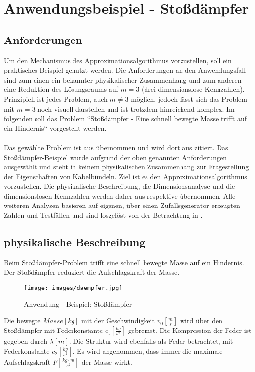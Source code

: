 \section{Anwendungsbeispiel - Stoßdämpfer}
\label{sec:anwendungBSP}
\subsection{Anforderungen}
\label{subsec:anforderungenBSP}
Um den Mechanismus des Approximationsalgorithmus vorzustellen, soll ein praktisches Beispiel genutzt werden. Die Anforderungen an den Anwendungsfall sind zum einen ein bekannter physikalischer Zusammenhang und zum anderen eine Reduktion des Lösungsraums auf $m = 3$ (drei dimensionslose Kennzahlen). Prinzipiell ist jedes Problem, auch $m \neq 3$ möglich, jedoch lässt sich das Problem mit $m = 3$ noch visuell darstellen und ist trotzdem hinreichend komplex. Im folgenden soll das Problem ``Stoßdämpfer - Eine schnell bewegte Masse trifft auf ein Hindernis`` vorgestellt werden.\\
\parskip 12pt \\
Das gewählte Problem ist aus \cite{Her04} übernommen und wird dort aus \cite{Szi89} zitiert. Das Stoßdämpfer-Beispiel wurde aufgrund der oben genannten Anforderungen ausgewählt und steht in keinem physikalischen Zusammenhang zur Fragestellung der Eigenschaften von Kabelbündeln. Ziel ist es den Approximationsalgorithmus vorzustellen. Die physikalische Beschreibung, die Dimensionsanalyse und die dimensionslosen Kennzahlen werden daher aus \cite{Szi89} respektive \cite{Her04} übernommen. Alle weiteren Analysen basieren auf eigenen, über einen Zufallsgenerator erzeugten Zahlen und Testfällen und sind losgelöst von der Betrachtung in \cite{Her04}.

\subsection{physikalische Beschreibung}
\label{subsec:physBeschr}
Beim Stoßdämpfer-Problem trifft eine schnell bewegte Masse auf ein Hindernis. Der Stoßdämpfer reduziert die Aufschlagskraft der Masse.
\begin{figure}[h]
	\centering
		\texttt{[image: images/daempfer.jpg]}
	\caption[Anwendung - Beispiel: Stoßdämpfer]{Anwendung - Beispiel: Stoßdämpfer \cite{Szi89}}
	\label{fig:daempfer}
\end{figure}
 Die bewegte $Masse[kg]$ mit der Geschwindigkeit $v_0[\frac{m}{s}]$ wird über den Stoßdämpfer mit Federkonstante $c_1[\frac{kg}{s^2}]$ gebremst. Die Kompression der Feder ist gegeben durch $\lambda[m]$. Die Struktur wird ebenfalls als Feder betrachtet, mit Federkonstante $c_2[\frac{kg}{s^2}]$. Es wird angenommen, dass immer die maximale Aufschlagskraft $F[\frac{kg \cdot m}{s^2}]$ der Masse wirkt. 

